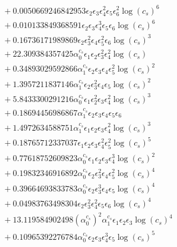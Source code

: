 \documentclass[10pt]{article}
\begin{document}
\begin{align*}
&{}  + 0.0050669246842953 \epsilon_{2} \epsilon_{3} \epsilon_{4}^{2} \epsilon_{5} \epsilon_{6}^{2} \log{\left(c_{s} \right)}^{6} \\
&{}  + 0.010133849368591 \epsilon_{2} \epsilon_{3} \epsilon_{4}^{3} \epsilon_{5} \epsilon_{6} \log{\left(c_{s} \right)}^{6} \\
&{}  + 0.16736171989869 \epsilon_{2} \epsilon_{3}^{2} \epsilon_{4} \epsilon_{5}^{2} \epsilon_{6} \log{\left(c_{s} \right)}^{3} \\
&{}  + 22.309384357425 \alpha_{0}^{c_s} \epsilon_{1} \epsilon_{2} \epsilon_{3}^{2} \epsilon_{4}^{2} \log{\left(c_{s} \right)} \\
&{}  + 0.34893029592866 \alpha_{1}^{c_s} \epsilon_{2} \epsilon_{3} \epsilon_{4} \epsilon_{5}^{2} \log{\left(c_{s} \right)}^{2} \\
&{}  + 1.3957211837146 \alpha_{1}^{c_s} \epsilon_{2} \epsilon_{3}^{2} \epsilon_{4} \epsilon_{5} \log{\left(c_{s} \right)}^{2} \\
&{}  + 5.8433300291216 \alpha_{0}^{c_s} \epsilon_{1} \epsilon_{2}^{2} \epsilon_{3} \epsilon_{4}^{2} \log{\left(c_{s} \right)}^{3} \\
&{}  + 0.18694456986867 \alpha_{1}^{c_s} \epsilon_{2} \epsilon_{3} \epsilon_{4} \epsilon_{5} \epsilon_{6} \\
&{}  + 1.4972634588751 \alpha_{1}^{c_s} \epsilon_{1} \epsilon_{2} \epsilon_{3} \epsilon_{4}^{2} \log{\left(c_{s} \right)}^{3} \\
&{}  + 0.18765712337037 \epsilon_{1} \epsilon_{2} \epsilon_{3} \epsilon_{4}^{2} \epsilon_{5}^{2} \log{\left(c_{s} \right)}^{5} \\
&{}  + 0.77618752609823 \alpha_{0}^{c_s} \epsilon_{1} \epsilon_{2} \epsilon_{3} \epsilon_{4}^{3} \log{\left(c_{s} \right)}^{2} \\
&{}  + 0.19832346916892 \alpha_{0}^{c_s} \epsilon_{2} \epsilon_{3}^{2} \epsilon_{4} \epsilon_{5}^{2} \log{\left(c_{s} \right)}^{4} \\
&{}  + 0.39664693833783 \alpha_{0}^{c_s} \epsilon_{2} \epsilon_{3}^{3} \epsilon_{4} \epsilon_{5} \log{\left(c_{s} \right)}^{4} \\
&{}  + 0.04983763498304 \epsilon_{2} \epsilon_{3}^{2} \epsilon_{4}^{2} \epsilon_{5} \epsilon_{6} \log{\left(c_{s} \right)}^{4} \\
&{}  + 13.119584902498 \left(\alpha_{0}^{c_s}\right)^{2} \alpha_{1}^{c_s} \epsilon_{1} \epsilon_{2} \epsilon_{3} \log{\left(c_{s} \right)}^{4} \\
&{}  + 0.10965392276784 \alpha_{0}^{c_s} \epsilon_{2} \epsilon_{3} \epsilon_{4}^{3} \epsilon_{5} \log{\left(c_{s} \right)}^{5} \\

\end{align*}
\end{document}
